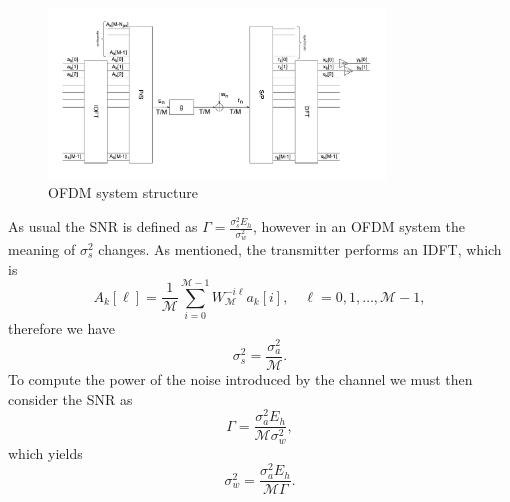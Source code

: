 \documentclass[10pt]{article}
\newcommand{\ofdM} {\mathcal{M}}
\begin{document}
\begin{figure}[h!]
	\centering
	\includegraphics[width = 0.8\textwidth]{OFDM}
	\caption{OFDM system structure}
	\label{fig:OFDM}
\end{figure}
As usual the SNR is defined as $\Gamma = \frac{\sigma_s^2 E_h}{\sigma_w^2}$, however in an OFDM system the meaning of $\sigma_s^2$ changes. As mentioned, the transmitter performs an IDFT, which is
\begin{equation}
	A_k[\ell] = \frac{1}{\ofdM} \sum_{i = 0}^{\ofdM - 1} W_{\ofdM}^{-i\ell} a_k[i], \quad \ell = 0, 1, \dots, \ofdM-1,
\end{equation}
therefore we have 
\begin{equation}
	\sigma_s^2 = \dfrac{\sigma_a^2}{\ofdM}.
\end{equation}
To compute the power of the noise introduced by the channel we must then consider the SNR as
\begin{equation}
	\Gamma = \dfrac{\sigma_a^2 E_h}{\ofdM \sigma_w^2},
	\label{eq:snrOFDM}
\end{equation}
which yields
\begin{equation}
	\sigma_w^2 = \dfrac{\sigma_a^2 E_h}{\ofdM \Gamma}.
\end{equation}
\end{document}
